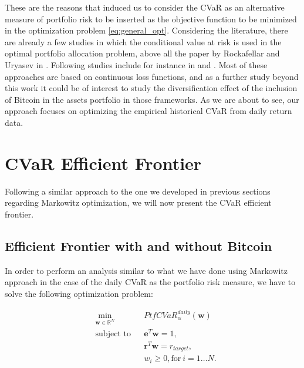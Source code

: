 These are the reasons that induced us to consider the CVaR as an alternative measure of portfolio risk to be inserted as the objective function to be minimized in the optimization problem \eqref{eq:general_opt}. 
Considering the literature, there are already a few studies in which the conditional value at risk is used in the optimal portfolio allocation problem,  above all the paper by Rockafellar and Uryasev in \citep{ROCKAFELLAR2000}. Following studies include for instance in \citep{DICLEMENTE2002} and \citep{QUARANTA2008}. 
Most of these approaches are based on continuous loss functions, and as a further study beyond this work it could be of interest to study the diversification effect of the inclusion of Bitcoin in the assets portfolio in those frameworks. As we are about to see, our approach  focuses on optimizing the empirical historical CVaR from daily return data.




\section{CVaR Efficient Frontier}
\label{sec:cvar_frontier}

Following a similar approach to the one we developed in previous sections regarding Markowitz optimization, we will now present the CVaR efficient frontier.

\subsection{Efficient Frontier with and without Bitcoin}


In order to perform an  analysis similar to what we have done using Markowitz approach in the case of the daily CVaR as the portfolio risk measure, we have to solve the following optimization problem:

\begin{subequations}
	\label{eq:general_opt_CVaR}
	\begin{align}
	&\!\min_{\mathbf{w}\in \mathbb{R}^{N}}     &    & PtfCVaR_\alpha^{daily}(\mathbf{w}) \\
	& \text{subject to}   &   & \mathbf{e}^T\mathbf{w} = 1 ,\\
	&                 &       & \mathbf{r}^T\mathbf{w} = r_{target},\label{eq:constraint2b} \\
	&		   &      & w_{i} \geq 0, \text{for} \: i = 1\dots N. 
	\end{align}
\end{subequations}

